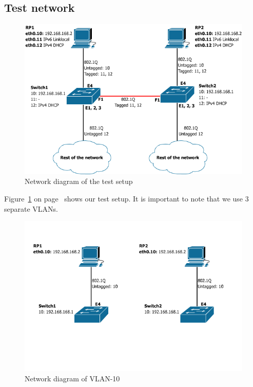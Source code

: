 \documentclass{article}
\begin{document}
\subsection{Test network}
\begin{figure}[h]
\centerline{\includegraphics[scale=0.4]{images/PoC_all.png}}
\caption{Network diagram of the test setup}
\label{fig:poc_all}
\end{figure}

Figure~\ref{fig:poc_all} on page~\pageref{fig:poc_all} shows our test setup.
It is important to note that we use 3 separate VLANs. 

\begin{figure}[h]
\centerline{\includegraphics[scale=0.4, trim = 0mm 50mm 0mm 0mm]{images/PoC_10.png}}
\caption{Network diagram of VLAN-10}
\label{fig:poc_10}
\end{figure}
\end{document}
